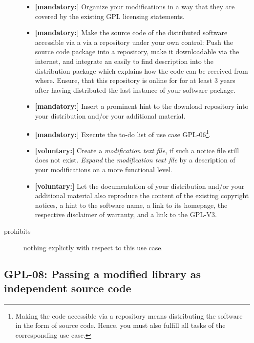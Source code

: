 \begin{description}
\begin{itemize}
  \item \textbf{[mandatory:]} Organize your modifications in a way that they are
  covered by the existing GPL licensing statements.
  
  \item \textbf{[mandatory:]} Make the source code of the distributed software
  accessible via a via a repository under your own control: Push the source code
  package into a repository, make it downloadable via the internet, and
  integrate an easily to find description into the distribution package which
  explains how the code can be received from where. Ensure, that this repository
  is online for for at least 3 years after having distributed the last instance
  of your software package.
  
  \item \textbf{[mandatory:]} Insert a prominent hint to the download repository
  into your distribution and/or your additional material.
  
  \item \textbf{[mandatory:]} Execute the to-do list of use case GPL-06\footnote{
  Making the code accessible via a repository means distributing the software in
  the form of source code. Hence, you must also fulfill all tasks of the
  corresponding use case.}.

  
  \item \textbf{[voluntary:]} Create a \emph{modification text file}, if such a
  notice file still does not exist. \emph{Expand} the \emph{modification text
  file} by a description of your modifications on a more functional level.
      
  \item \textbf{[voluntary:]} Let the documentation of your distribution and/or
  your additional material also reproduce the content of the existing
  copyright notices, a hint to the software name, a link to its homepage,
  the respective disclaimer of warranty, and a link to the GPL-V3.


\end{itemize}

\item[prohibits] nothing explictly with respect to this use case.

\end{description}

\subsection{GPL-08: Passing a modified library as independent source code}
\label{OSUC-08S-GPL}

